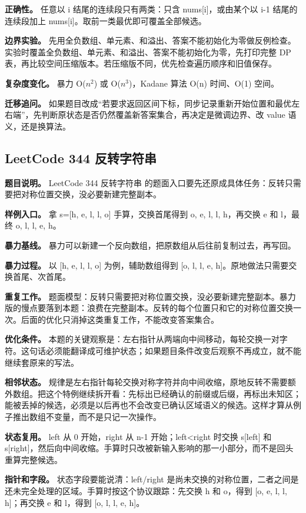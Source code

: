 \textbf{正确性。} 任意以 i 结尾的连续段只有两类：只含 nums[i]，或由某个以 i-1 结尾的连续段加上 nums[i]。取前一类最优即可覆盖全部候选。

\textbf{边界实验。} 先用全负数组、单元素、和溢出、答案不能初始化为零做反例检查。实验时覆盖全负数组、单元素、和溢出、答案不能初始化为零，先打印完整 DP 表，再比较空间压缩版本。若压缩版不同，优先检查遍历顺序和旧值保存。

\textbf{复杂度变化。} 暴力 O(\ensuremath{n^{2}}) 或 O(\ensuremath{n^{3}})，Kadane 算法 O(n) 时间、O(1) 空间。

\textbf{迁移追问。} 如果题目改成“若要求返回区间下标，同步记录重新开始位置和最优左右端”，先判断原状态是否仍然覆盖新答案集合，再决定是微调边界、改 value 语义，还是换算法。

\subsection{LeetCode 344 反转字符串}

\textbf{题目说明。} LeetCode 344 反转字符串 的题面入口要先还原成具体任务：反转只需要把对称位置交换，没必要新建完整副本。

\textbf{样例入口。} 拿 s=[h, e, l, l, o] 手算，交换首尾得到 o, e, l, l, h，再交换 e 和 l，最终 o, l, l, e, h。

\textbf{暴力基线。} 暴力可以新建一个反向数组，把原数组从后往前复制过去，再写回。

\textbf{暴力过程。} 以 [h, e, l, l, o] 为例，辅助数组得到 [o, l, l, e, h]。原地做法只需要交换首尾、次首尾。

\textbf{重复工作。} 题面模型：反转只需要把对称位置交换，没必要新建完整副本。暴力版的慢点要落到本题：浪费在完整副本。反转的每个位置只和它的对称位置交换一次。后面的优化只消掉这类重复工作，不能改变答案集合。

\textbf{优化条件。} 本题的关键观察是：左右指针从两端向中间移动，每轮交换一对字符。这句话必须能翻译成可维护状态；如果题目条件改变后观察不再成立，就不能继续套原来的写法。

\textbf{相邻状态。} 规律是左右指针每轮交换对称字符并向中间收缩，原地反转不需要额外数组。把这个特例继续拆开看：先标出已经确认的前缀或后缀，再标出未知区；能被丢掉的候选，必须是以后再也不会改变已确认区域语义的候选。这样才算从例子推出数组不变量，而不是只记一次操作。

\textbf{状态复用。} left 从 0 开始，right 从 n-1 开始；left<right 时交换 s[left] 和 s[right]，然后向中间收缩。手算时只改被新输入影响的那一小部分，而不是回头重算完整候选。

\textbf{指针和字段。} 状态字段要能说清：left/right 是尚未交换的对称位置，二者之间是还未完全处理的区域。手算时按这个协议跟踪：先交换 h 和 o，得到 [o, e, l, l, h]；再交换 e 和 l，得到 [o, l, l, e, h]。

